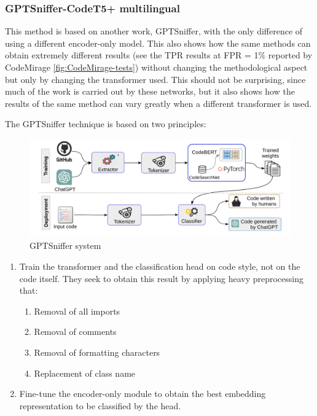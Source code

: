 \subsubsection{GPTSniffer-CodeT5+ multilingual}
This method is based on another work, GPTSniffer\cite{nguyen2024gptsniffer}, 
with the only difference 
of using a different encoder-only model. This also shows how the same methods 
can obtain extremely different results (see the TPR results at FPR = 1\% 
reported by CodeMirage \ref{fig:CodeMirage-tests}) 
without changing the methodological aspect but only by 
changing the transformer used. This should not be surprising, since much of the 
work is carried out by these networks, but it also shows how the results of the 
same method can vary greatly when a different transformer is used.

The GPTSniffer technique is based on two principles:
\begin{figure}[H]
    \centering
    \includegraphics[width=1\textwidth]{img/gptsniffer/system components.png}
    \caption{GPTSniffer system}
    \label{fig:GPTSniffer system}
\end{figure}
\begin{enumerate}
    \item Train the transformer and the classification head on code style, 
    not on the code itself. 
    They seek to obtain this result by applying heavy preprocessing that:   
    \begin{enumerate}
        \item Removal of all imports
        \item Removal of comments
        \item Removal of formatting characters
        \item Replacement of class name
    \end{enumerate}
    \item Fine-tune the encoder-only module to obtain the best embedding 
    representation to be classified by the head.
\end{enumerate}

